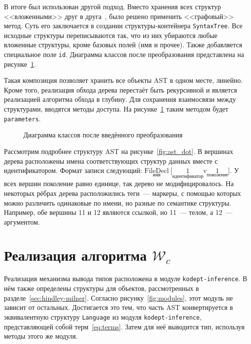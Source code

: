 В итоге был использован другой подход.
Вместо хранения всех структур <<вложенными>> друг в друга~, было решено применить <<графовый>> метод.
Суть его заключается в создании структуры-контейнера \lstinline{SyntaxTree}.
Все исходные структуры переписываются так, что из них убираются любые вложенные структуры, кроме базовых полей (имя и прочее).
Также добавляется специальное поле \lstinline{id}.
Диаграмма классов после преобразования представлена на рисунке~\ref{fig:func_AST_after}.

Такая композиция позволяет хранить все объекты AST в одном месте, линейно.
Кроме того, реализация обхода дерева перестаёт быть рекурсивной и является реализацией алгоритма обхода в глубину.
Для сохранения взаимосвязи между структурами, вводятся методы доступа.
На рисунке~\ref{fig:func_AST_after} таким методом будет \lstinline{parameters}.

\begin{figure}[H]
    \centering
    
    \caption{Диаграмма классов после введённого преобразования}
    \label{fig:func_AST_after}
\end{figure}

Рассмотрим подробнее структуру AST на рисунке~\ref{fig:ast_dot}.
В вершинах дерева расположены имена соответствующих структур данных вместе с идентификатором.
Формат записи следующий: $\underset{\text{имя}}{\text{FileDecl}}~\text{[}\underset{\text{идентификатор}}{1}\text{v}\underset{\text{поколение}}{1}\text{]}$.
У всех вершин поколение равно единице, так дерево не модифицировалось.
На некоторых рёбрах дерева расположились теги~--- маркеры, с помощью которых можно различить одинаковые по имени, но разные по семантике структуры.
Например, обе вершины 11 и 12 являются ссылкой, но 11~--- телом, а 12~--- аргументом.


\section{Реализация алгоритма $\mathcal{W}_c$}
\label{sec:algorithm_W}

Реализация механизма вывода типов расположена в модуле \lstinline{kodept-inference}.
В нём также определены структуры для объектов, рассмотренных в разделе~\ref{sec:hindley-milner}.
Согласно рисунку~\ref{fig:modules}, этот модуль не зависит от остальных.
Достигается это тем, что часть AST конвертируется в эквивалентную структуру \lstinline{Language} из модуля \lstinline{kodept-inference}, представляющей собой терм~\eqref{eq:terms}.
Затем для неё выводится тип, используя методы этого же модуля.

